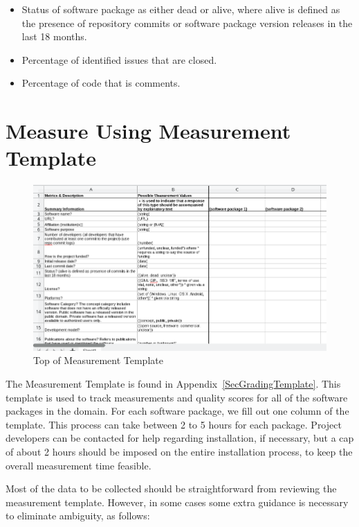 \documentclass[letterpaper,cleveref]{lipics-v2019}
\begin{document}
\begin{itemize}
\item Status of software package as either dead or alive, where alive is defined
  as the presence of repository commits or software package version releases in
  the last 18 months.
\item Percentage of identified issues that are closed.
\item Percentage of code that is comments.
\end{itemize}

\section{Measure Using Measurement Template} \label{SecMeasureTemplate}

\begin{figure}[h!]
  \begin{center}
    \includegraphics[width=1.0\textwidth]{measurement_template}
    \caption{Top of Measurement Template}
    \label{measurement_template_image}
  \end{center}
\end{figure}

The Measurement Template is found in
Appendix~\ref{SecGradingTemplate}.  This template is used to track measurements
and quality scores for all of the software packages in the domain. For each
software package, we fill out one column of the template. This process can take
between 2 to 5 hours for each package.  Project developers can be contacted for
help regarding installation, if necessary, but a cap of about 2 hours should be
imposed on the entire installation process, to keep the overall measurement time
feasible.

Most of the data to be collected should be straightforward from reviewing the
measurement template.  However, in some cases some extra guidance is necessary
to eliminate ambiguity, as follows:
\end{document}
